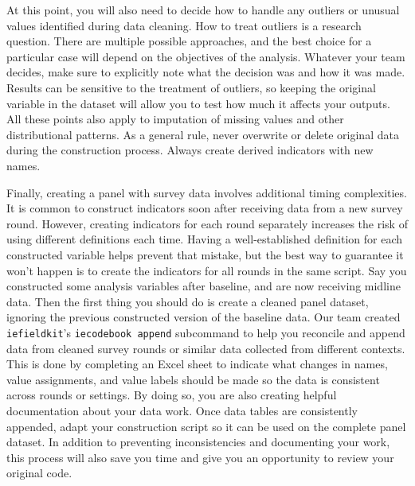 At this point, you will also need to decide
how to handle any outliers or unusual values identified during data cleaning.
How to treat outliers is a research question.
There are multiple possible approaches,
and the best choice for a particular case
will depend on the objectives of the analysis.
Whatever your team decides, make sure to explicitly note
what the decision was and how it was made.
Results can be sensitive to the treatment of outliers,
so keeping the original variable in the dataset
will allow you to test how much it affects your outputs.
All these points also apply to imputation of missing values and other distributional patterns.
As a general rule, never overwrite or delete original data during the construction process.
Always create derived indicators with new names.

Finally, creating a panel with survey data involves additional timing complexities.
It is common to construct indicators soon after receiving data from a new survey round.
However, creating indicators for each round separately increases the risk of using different definitions each time.
Having a well-established definition for each constructed variable helps prevent that mistake,
but the best way to guarantee it won't happen is to create the indicators for all rounds in the same script.
Say you constructed some analysis variables after baseline, and are now receiving midline data.
Then the first thing you should do is create a cleaned panel dataset,
ignoring the previous constructed version of the baseline data.
Our team created \texttt{iefieldkit}'s \texttt{iecodebook append} subcommand
to help you reconcile and append data from cleaned survey rounds
or similar data collected from different contexts.
This is done by completing an Excel sheet to indicate what changes in
names, value assignments, and value labels should be made so the data is consistent across rounds or settings.
By doing so, you are also creating helpful documentation about your data work.
Once data tables are consistently appended,
adapt your construction script so it can be used on the complete panel dataset.
In addition to preventing inconsistencies and documenting your work,
this process will also save you time and give you an opportunity to review your original code.



